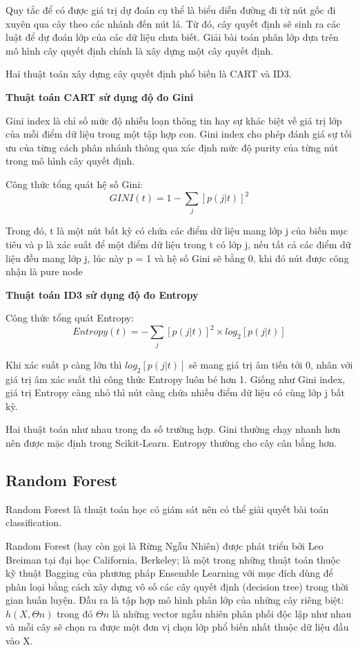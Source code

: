 \documentclass[12pt,a4paper,oneside]{book}
\begin{document}
		Quy tắc để có được giá trị dự đoán cụ thể là biểu diễn đường đi từ nút gốc đi xuyên qua cây theo các nhánh đến nút lá. Từ đó, cây quyết định sẽ sinh ra các luật để dự đoán lớp của các dữ liệu chưa biết. Giải bài toán phân lớp dựa trên mô hình cây quyết định chính là xây dựng một cây quyết định.
		
		Hai thuật toán xây dựng cây quyết định phổ biến là CART và ID3.
		
		\textbf{Thuật toán CART sử dụng độ đo Gini}
		
		Gini index là chỉ số mức độ nhiễu loạn thông tin hay sự khác biệt về giá trị lớp của mỗi điểm dữ liệu trong một tập hợp con. Gini index cho phép đánh giá sự tối ưu của từng cách phân nhánh thông qua xác định mức độ purity của từng nút trong mô hình cây quyết định.
		
		Công thức tổng quát hệ số Gini:
		\begin{equation}
			GINI(t) = 1 - \sum_{j} [p(j|t)]^2
		\end{equation}
	
		Trong đó, t là một nút bất kỳ có chứa các điểm dữ liệu mang lớp j của biến mục tiêu và p là xác suất để một điểm dữ liệu trong t có lớp j, nếu tất cả các điểm dữ liệu đều mang lớp j, lúc này p = 1 và hệ số Gini sẽ bằng 0, khi đó nút được công nhận là pure node
		
		\textbf{Thuật toán ID3 sử dụng độ đo Entropy}
		
		Công thức tổng quát Entropy:
		\begin{equation}
			Entropy(t) = - \sum_{j} [p(j|t)]^2 \times log_{2}[p(j|t)] 
		\end{equation}
	
		Khi xác suất p càng lớn thì $log_{2}[p(j|t)]$ sẽ mang giá trị âm tiến tới 0, nhân với giá trị âm xác suất thì công thức Entropy luôn bé hơn 1. Giống như Gini index, giá trị Entropy càng nhỏ thì nút càng chứa nhiều điểm dữ liệu có cùng lớp j bất kỳ.
		
		Hai thuật toán như nhau trong đa số trường hợp. Gini thường chạy nhanh hơn nên được mặc định trong Scikit-Learn. Entropy thường cho cây cân bằng hơn.
			
		\subsection{Random Forest}
		Random Forest là thuật toán học có giám sát nên có thể giải quyết bài toán classification.
		
		Random Forest (hay còn gọi là Rừng Ngẫu Nhiên)  được phát triển bởi Leo Breiman tại đại học California, Berkeley; là một trong những thuật toán thuộc kỹ thuật Bagging của phương pháp Ensemble Learning với mục đích dùng để phân loại bằng cách xây dựng vô số các cây quyết định (decision tree) trong thời gian huấn luyện. Đầu ra là tập hợp mô hình phân lớp của những cây riêng biệt:
		${h(X, \Theta n)}$ trong đó $\Theta n$ là những vector ngẫu nhiên phân phối độc lập như nhau và mỗi cây sẽ chọn ra được một đơn vị chọn lớp phổ biến nhất thuộc dữ liệu đầu vào X.
		
\end{document}
